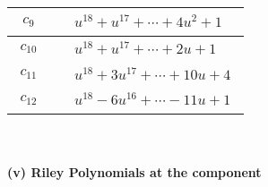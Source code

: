 \documentclass[1p]{elsarticle_modified}
\theoremstyle{definition}
\begin{document}
\begin{tabular}{m{50pt}|m{274pt}}
\hline $$\begin{aligned}c_{9}\end{aligned}$$&$\begin{aligned}
&u^{18}+u^{17}+\cdots+4 u^2+1
\end{aligned}$\\
\hline $$\begin{aligned}c_{10}\end{aligned}$$&$\begin{aligned}
&u^{18}+u^{17}+\cdots+2 u+1
\end{aligned}$\\
\hline $$\begin{aligned}c_{11}\end{aligned}$$&$\begin{aligned}
&u^{18}+3 u^{17}+\cdots+10 u+4
\end{aligned}$\\
\hline $$\begin{aligned}c_{12}\end{aligned}$$&$\begin{aligned}
&u^{18}-6 u^{16}+\cdots-11 u+1
\end{aligned}$\\
\hline
\end{tabular}\\~\\
\newpage\renewcommand{\arraystretch}{1}
\flushleft \textbf{(v) Riley Polynomials at the component}\newline \\
\end{document}
